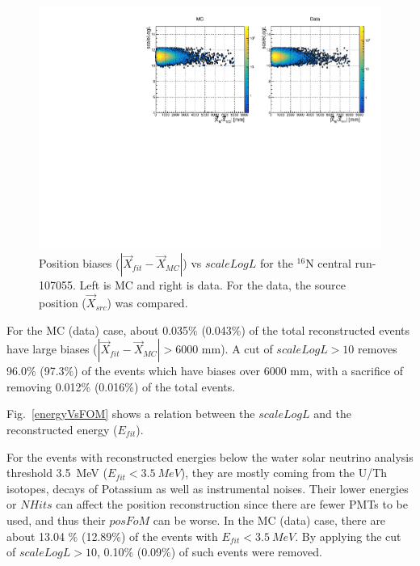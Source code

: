 \begin{figure}
	\centering
		\includegraphics[width=13cm]{N16_107055_scaleLogLvsPosBias.pdf}
	\caption{Position biases ($|\vec{X}_{fit}-\vec{X}_{MC}|$) vs $scaleLogL$ for the $^{16}$N central run-107055. Left is MC and right is data. For the data, the source position ($\vec{X}_{src}$) was compared.}
	\label{posBiasVsFOM}
\end{figure}

For the MC (data) case, about 0.035\% (0.043\%) of the total reconstructed events have large biases ($|\vec{X}_{fit}-\vec{X}_{MC}|>6000$ mm). A cut of $scaleLogL>10$ removes 96.0\% (97.3\%) of the events which have biases over 6000 mm, with a sacrifice of removing 0.012\% (0.016\%) of the total events.

Fig.~\ref{energyVsFOM} shows a relation between the $scaleLogL$ and the reconstructed energy ($E_{fit}$). 

For the events with reconstructed energies below the water solar neutrino analysis threshold 3.5~MeV ($E_{fit}<3.5~MeV$), they are mostly coming from the U/Th isotopes, decays of Potassium as well as instrumental noises\cite{waterunidoc}. Their lower energies or $NHits$ can affect the position reconstruction since there are fewer PMTs to be used, and thus their $posFoM$ can be worse.
In the MC (data) case, there are about 13.04 \% (12.89\%) of the events with $E_{fit}<3.5~MeV$. By applying the cut of $scaleLogL>10$, 0.10\% (0.09\%) of such events were removed.

